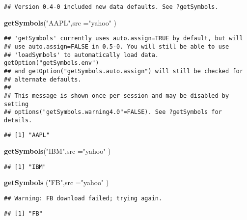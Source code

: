\documentclass[]{article}
\newenvironment{Shaded}{\begin{snugshade}}{\end{snugshade}}
\newcommand{\DataTypeTok}[1]{\textcolor[rgb]{0.13,0.29,0.53}{#1}}
\newcommand{\KeywordTok}[1]{\textcolor[rgb]{0.13,0.29,0.53}{\textbf{#1}}}
\newcommand{\NormalTok}[1]{#1}
\newcommand{\StringTok}[1]{\textcolor[rgb]{0.31,0.60,0.02}{#1}}
\begin{document}
\begin{verbatim}
## Version 0.4-0 included new data defaults. See ?getSymbols.
\end{verbatim}

\begin{Shaded}
\begin{Highlighting}[]
\KeywordTok{getSymbols}\NormalTok{(}\StringTok{"AAPL"}\NormalTok{,}\DataTypeTok{src =}\StringTok{"yahoo"}\NormalTok{ )}
\end{Highlighting}
\end{Shaded}

\begin{verbatim}
## 'getSymbols' currently uses auto.assign=TRUE by default, but will
## use auto.assign=FALSE in 0.5-0. You will still be able to use
## 'loadSymbols' to automatically load data. getOption("getSymbols.env")
## and getOption("getSymbols.auto.assign") will still be checked for
## alternate defaults.
## 
## This message is shown once per session and may be disabled by setting 
## options("getSymbols.warning4.0"=FALSE). See ?getSymbols for details.
\end{verbatim}

\begin{verbatim}
## [1] "AAPL"
\end{verbatim}

\begin{Shaded}
\begin{Highlighting}[]
\KeywordTok{getSymbols}\NormalTok{(}\StringTok{"IBM"}\NormalTok{,}\DataTypeTok{src =}\StringTok{"yahoo"}\NormalTok{ )}
\end{Highlighting}
\end{Shaded}

\begin{verbatim}
## [1] "IBM"
\end{verbatim}

\begin{Shaded}
\begin{Highlighting}[]
\KeywordTok{getSymbols}\NormalTok{ (}\StringTok{"FB"}\NormalTok{,}\DataTypeTok{src =}\StringTok{"yahoo"}\NormalTok{ )}
\end{Highlighting}
\end{Shaded}

\begin{verbatim}
## Warning: FB download failed; trying again.
\end{verbatim}

\begin{verbatim}
## [1] "FB"
\end{verbatim}
\end{document}
